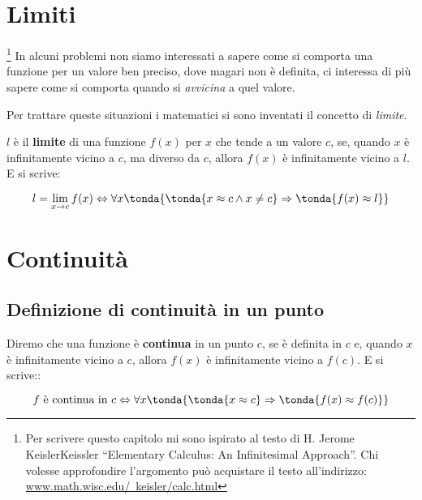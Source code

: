 \begin{center}
\begin{inaccessibleblock}[TODO.]
%   
\end{inaccessibleblock}
\end{center}

\section{Limiti}
\label{sec:cont_limiti}

\footnote{Per scrivere questo capitolo mi sono ispirato 
al testo di H. Jerome KeislerKeissler ``Elementary Calculus: An Infinitesimal 
Approach''. 
Chi volesse approfondire l'argomento può acquistare il testo 
all'indirizzo: 
\href{https://www.math.wisc.edu/~keisler/calc.html}
     {www.math.wisc.edu/~keisler/calc.html}}
In alcuni problemi non siamo interessati a sapere come si comporta una funzione 
per un valore ben preciso, dove magari non è definita, ci interessa di più 
sapere come si comporta quando si \emph{avvicina} a quel valore.

Per trattare queste situazioni i matematici si sono inventati il concetto di 
\emph{limite}.


\begin{definizione}
\(l\) è il \textbf{limite} di una funzione \(f(x)\) per \(x\) 
che tende a un 
valore \(c\), se, quando \(x\) è infinitamente vicino a \(c\), 
ma diverso da \(c\), 
allora \(f(x)\) è infinitamente vicino a \(l\). E si scrive:

\[l=\lim_{x \rightarrow c} f(x) \Leftrightarrow 
\forall x \tonda{\tonda{x \approx c \wedge x \neq c} \Rightarrow 
\tonda{f(x) \approx l}}\]

\end{definizione}


\section{Continuità}
\label{sec:cont_continuita}

\subsection{Definizione di continuità in un punto}
\label{subsec:cont_definizione}


\begin{definizione}
Diremo che una funzione è \textbf{continua} in un punto \(c\), 
se è definita in \(c\) e, 
quando \(x\) è infinitamente vicino a \(c\), 
allora \(f(x)\) è infinitamente vicino a \(f(c)\). E si scrive::

\[f \text{ è continua in } c \Leftrightarrow 
\forall x \tonda{\tonda{x \approx c} \Rightarrow 
\tonda{f(x) \approx f(c)}}\]

\end{definizione}

